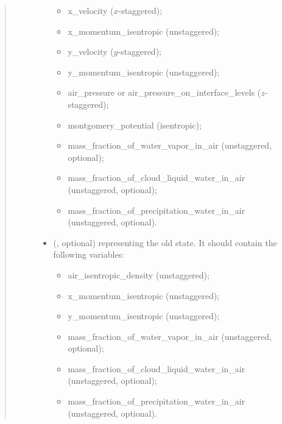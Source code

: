 \documentclass[letterpaper,10pt,english]{sphinxmanual}
\begin{document}
\begin{fulllineitems}
\begin{fulllineitems}
\begin{quote}
\begin{description}
\begin{itemize}
\begin{itemize}
\item {} 
x\_velocity (\(x\)-staggered);

\item {} 
x\_momentum\_isentropic (unstaggered);

\item {} 
y\_velocity (\(y\)-staggered);

\item {} 
y\_momentum\_isentropic (unstaggered);

\item {} 
air\_pressure or air\_pressure\_on\_interface\_levels (\(z\)-staggered);

\item {} 
montgomery\_potential (isentropic);

\item {} 
mass\_fraction\_of\_water\_vapor\_in\_air (unstaggered, optional);

\item {} 
mass\_fraction\_of\_cloud\_liquid\_water\_in\_air (unstaggered, optional);

\item {} 
mass\_fraction\_of\_precipitation\_water\_in\_air (unstaggered, optional).

\end{itemize}


\item {} 
 (, optional) \textendash{} 
{\hyperref[\detokenize{api:tasmania.storages.state_isentropic.StateIsentropic}]{}} representing the old state.
It should contain the following variables:
\begin{itemize}
\item {} 
air\_isentropic\_density (unstaggered);

\item {} 
x\_momentum\_isentropic (unstaggered);

\item {} 
y\_momentum\_isentropic (unstaggered);

\item {} 
mass\_fraction\_of\_water\_vapor\_in\_air (unstaggered, optional);

\item {} 
mass\_fraction\_of\_cloud\_liquid\_water\_in\_air (unstaggered, optional);

\item {} 
mass\_fraction\_of\_precipitation\_water\_in\_air (unstaggered, optional).


\end{itemize}
\end{itemize}
\end{description}
\end{quote}
\end{fulllineitems}
\end{fulllineitems}
\end{document}

